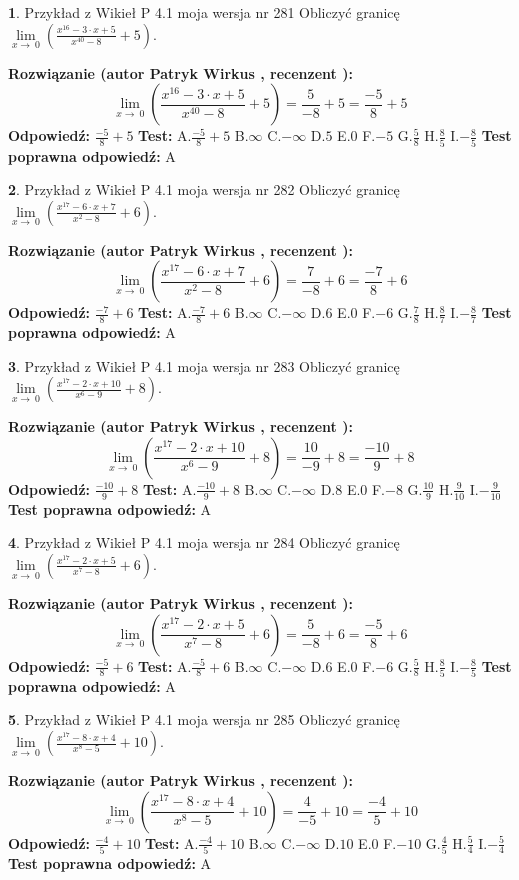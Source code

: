 \documentclass[12pt, a4paper]{article}
\theoremstyle{definition} %
\newtheorem{zad}{}
\newcommand{\zadStart}[1]{\begin{zad}#1\newline}
\newcommand{\zadStop}{\end{zad}}
\newcommand{\rozwStart}[2]{\noindent \textbf{Rozwiązanie (autor #1 , recenzent #2): }\newline}
\newcommand{\rozwStop}{\newline}
\newcommand{\odpStart}{\noindent \textbf{Odpowiedź:}\newline}
\newcommand{\odpStop}{\newline}
\newcommand{\testStart}{\noindent \textbf{Test:}\newline}
\newcommand{\testStop}{\newline}
\newcommand{\kluczStart}{\noindent \textbf{Test poprawna odpowiedź:}\newline}
\newcommand{\kluczStop}{\newline}
\begin{document}
\zadStart{Przykład z Wikieł P 4.1 moja wersja nr 281}
Obliczyć granicę $\lim\limits_{x\to\ 0}(\frac{x^{16}-3 \cdot x +5}{x^{40}-8}+5)$.
\zadStop
\rozwStart{Patryk Wirkus}{}
$$\lim\limits_{x\to\ 0}(\frac{x^{16}-3 \cdot x +5}{x^{40}-8}+5)=\frac{5}{-8}+5=\frac{-5}{8}+5$$
\rozwStop
\odpStart
$\frac{-5}{8}+5$
\odpStop
\testStart
A.$\frac{-5}{8}+5$
B.$\infty$
C.$-\infty$
D.$5$
E.$0$
F.$-5$
G.$\frac{5}{8}$
H.$\frac{8}{5}$
I.$-\frac{8}{5}$
\testStop
\kluczStart
A
\kluczStop



\zadStart{Przykład z Wikieł P 4.1 moja wersja nr 282}
Obliczyć granicę $\lim\limits_{x\to\ 0}(\frac{x^{17}-6 \cdot x +7}{x^{2}-8}+6)$.
\zadStop
\rozwStart{Patryk Wirkus}{}
$$\lim\limits_{x\to\ 0}(\frac{x^{17}-6 \cdot x +7}{x^{2}-8}+6)=\frac{7}{-8}+6=\frac{-7}{8}+6$$
\rozwStop
\odpStart
$\frac{-7}{8}+6$
\odpStop
\testStart
A.$\frac{-7}{8}+6$
B.$\infty$
C.$-\infty$
D.$6$
E.$0$
F.$-6$
G.$\frac{7}{8}$
H.$\frac{8}{7}$
I.$-\frac{8}{7}$
\testStop
\kluczStart
A
\kluczStop



\zadStart{Przykład z Wikieł P 4.1 moja wersja nr 283}
Obliczyć granicę $\lim\limits_{x\to\ 0}(\frac{x^{17}-2 \cdot x +10}{x^{6}-9}+8)$.
\zadStop
\rozwStart{Patryk Wirkus}{}
$$\lim\limits_{x\to\ 0}(\frac{x^{17}-2 \cdot x +10}{x^{6}-9}+8)=\frac{10}{-9}+8=\frac{-10}{9}+8$$
\rozwStop
\odpStart
$\frac{-10}{9}+8$
\odpStop
\testStart
A.$\frac{-10}{9}+8$
B.$\infty$
C.$-\infty$
D.$8$
E.$0$
F.$-8$
G.$\frac{10}{9}$
H.$\frac{9}{10}$
I.$-\frac{9}{10}$
\testStop
\kluczStart
A
\kluczStop



\zadStart{Przykład z Wikieł P 4.1 moja wersja nr 284}
Obliczyć granicę $\lim\limits_{x\to\ 0}(\frac{x^{17}-2 \cdot x +5}{x^{7}-8}+6)$.
\zadStop
\rozwStart{Patryk Wirkus}{}
$$\lim\limits_{x\to\ 0}(\frac{x^{17}-2 \cdot x +5}{x^{7}-8}+6)=\frac{5}{-8}+6=\frac{-5}{8}+6$$
\rozwStop
\odpStart
$\frac{-5}{8}+6$
\odpStop
\testStart
A.$\frac{-5}{8}+6$
B.$\infty$
C.$-\infty$
D.$6$
E.$0$
F.$-6$
G.$\frac{5}{8}$
H.$\frac{8}{5}$
I.$-\frac{8}{5}$
\testStop
\kluczStart
A
\kluczStop



\zadStart{Przykład z Wikieł P 4.1 moja wersja nr 285}
Obliczyć granicę $\lim\limits_{x\to\ 0}(\frac{x^{17}-8 \cdot x +4}{x^{8}-5}+10)$.
\zadStop
\rozwStart{Patryk Wirkus}{}
$$\lim\limits_{x\to\ 0}(\frac{x^{17}-8 \cdot x +4}{x^{8}-5}+10)=\frac{4}{-5}+10=\frac{-4}{5}+10$$
\rozwStop
\odpStart
$\frac{-4}{5}+10$
\odpStop
\testStart
A.$\frac{-4}{5}+10$
B.$\infty$
C.$-\infty$
D.$10$
E.$0$
F.$-10$
G.$\frac{4}{5}$
H.$\frac{5}{4}$
I.$-\frac{5}{4}$
\testStop
\kluczStart
A
\kluczStop
\end{document}
